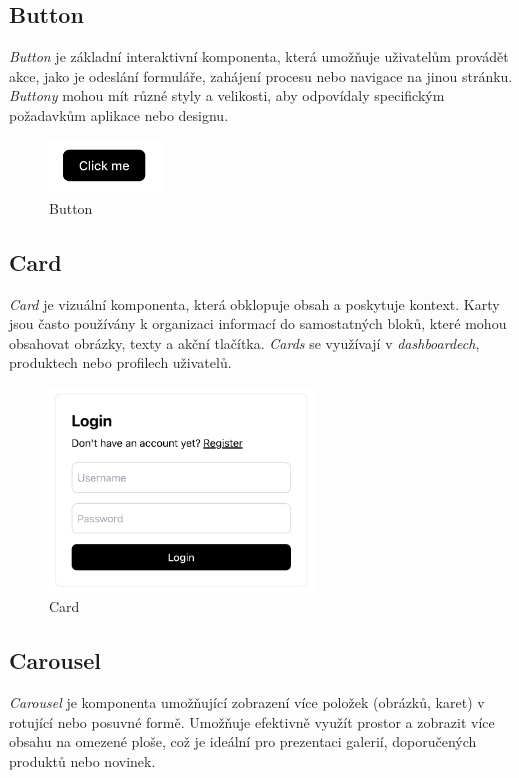 \subsection{Button}
\emph{Button} je základní interaktivní komponenta, která umožňuje uživatelům provádět akce, jako je odeslání formuláře, zahájení procesu nebo navigace na jinou stránku. \emph{Buttony} mohou mít různé styly a velikosti, aby odpovídaly specifickým požadavkům aplikace nebo designu.

\begin{figure}[H]
  \centering
  \includegraphics[width=3cm]{images/button}
  \captionsetup{justification=centering,margin=2cm}
  \caption{Button} \label{picture:button}
\end{figure}

\subsection{Card}
\emph{Card} je vizuální komponenta, která obklopuje obsah a poskytuje kontext. Karty jsou často používány k organizaci informací do samostatných bloků, které mohou obsahovat obrázky, texty a akční tlačítka. \emph{Cards} se využívají v \emph{dashboardech}, produktech nebo profilech uživatelů.

\begin{figure}[H]
  \centering
  \includegraphics[width=7cm]{images/card}
  \captionsetup{justification=centering,margin=2cm}
  \caption{Card} \label{picture:card}
\end{figure}

\subsection{Carousel}
\emph{Carousel} je komponenta umožňující zobrazení více položek (obrázků, karet) v rotující nebo posuvné formě. Umožňuje efektivně využít prostor a zobrazit více obsahu na omezené ploše, což je ideální pro prezentaci galerií, doporučených produktů nebo novinek.

